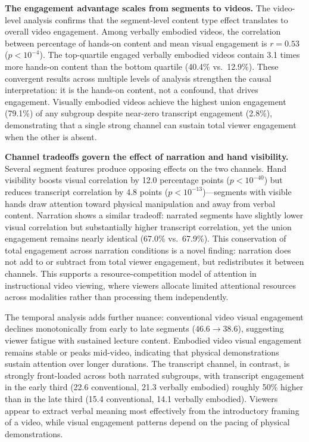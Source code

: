 \documentclass[fleqn,10pt]{wlscirep}
\begin{document}
\textbf{The engagement advantage scales from segments to videos.} The video-level analysis confirms that the segment-level content type effect translates to overall video engagement. Among verbally embodied videos, the correlation between percentage of hands-on content and mean visual engagement is $r = 0.53$ ($p < 10^{-4}$). The top-quartile engaged verbally embodied videos contain 3.1 times more hands-on content than the bottom quartile (40.4\% vs.\ 12.9\%). These convergent results across multiple levels of analysis strengthen the causal interpretation: it is the hands-on content, not a confound, that drives engagement. Visually embodied videos achieve the highest union engagement (79.1\%) of any subgroup despite near-zero transcript engagement (2.8\%), demonstrating that a single strong channel can sustain total viewer engagement when the other is absent.

\textbf{Channel tradeoffs govern the effect of narration and hand visibility.} Several segment features produce opposing effects on the two channels. Hand visibility boosts visual correlation by 12.0 percentage points ($p < 10^{-40}$) but reduces transcript correlation by 4.8 points ($p < 10^{-13}$)---segments with visible hands draw attention toward physical manipulation and away from verbal content. Narration shows a similar tradeoff: narrated segments have slightly lower visual correlation but substantially higher transcript correlation, yet the union engagement remains nearly identical (67.0\% vs.\ 67.9\%). This conservation of total engagement across narration conditions is a novel finding: narration does not add to or subtract from total viewer engagement, but redistributes it between channels. This supports a resource-competition model of attention in instructional video viewing, where viewers allocate limited attentional resources across modalities rather than processing them independently.

The temporal analysis adds further nuance: conventional video visual engagement declines monotonically from early to late segments ($46.6 \to 38.6$), suggesting viewer fatigue with sustained lecture content. Embodied video visual engagement remains stable or peaks mid-video, indicating that physical demonstrations sustain attention over longer durations. The transcript channel, in contrast, is strongly front-loaded across both narrated subgroups, with transcript engagement in the early third (22.6 conventional, 21.3 verbally embodied) roughly 50\% higher than in the late third (15.4 conventional, 14.1 verbally embodied). Viewers appear to extract verbal meaning most effectively from the introductory framing of a video, while visual engagement patterns depend on the pacing of physical demonstrations.
\end{document}
